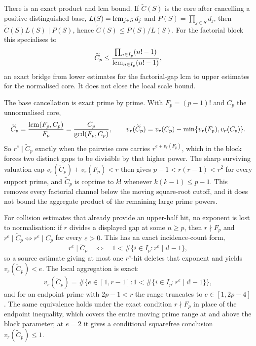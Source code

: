 \documentclass[11pt]{article}
\begin{document}
There is an exact product and lcm bound.  If $\widetilde C(S)$ is the core
after cancelling a positive distinguished base, $L(S)=\operatorname{lcm}_{j\in S}d_j$ and
$P(S)=\prod_{j\in S}d_j$, then $\widetilde C(S)L(S)\mid P(S)$, hence
$\widetilde C(S)\le P(S)/L(S)$.  For the factorial block this specialises to
\[
 \widetilde C_p\le\frac{\prod_{n\in I_p}(n!-1)}{\operatorname{lcm}_{n\in I_p}(n!-1)},
\]
an exact bridge from lower estimates for the factorial-gap lcm to upper
estimates for the normalised core.  It does not close the local scale bound.

The base cancellation is exact prime by prime.  With $F_p=(p-1)!$ and $C_p$
the unnormalised core,
\[
 \widetilde C_p=\frac{\operatorname{lcm}(F_p,C_p)}{F_p}=\frac{C_p}{\gcd(F_p,C_p)},\qquad
 v_r(\widetilde C_p)=v_r(C_p)-\min\{v_r(F_p),v_r(C_p)\} .
\]
So $r^e\mid\widetilde C_p$ exactly when the pairwise core carries
$r^{e+v_r(F_p)}$, which in the block forces two distinct gaps to be divisible
by that higher power.  The sharp surviving valuation cap
$v_r(\widetilde C_p)+v_r(F_p)<r$ then gives $p-1<r(r-1)<r^2$ for every
support prime, and $\widetilde C_p$ is coprime to $k!$ whenever
$k(k-1)\le p-1$.  This removes every factorial channel below the moving
square-root cutoff, and it does not bound the aggregate product of the
remaining large prime powers.

For collision estimates that already provide an upper-half hit, no exponent
is lost to normalisation: if $r$ divides a displayed gap at some $n\ge p$,
then $r\nmid F_p$ and $r^e\mid\widetilde C_p\iff r^e\mid C_p$ for every
$e>0$.  This has an exact incidence-count form,
\[
 r^e\mid\widetilde C_p
 \quad\Longleftrightarrow\quad
 1<\#\{i\in I_p:r^e\mid i!-1\},
\]
so a source estimate giving at most one $r^e$-hit deletes that exponent and
yields $v_r(\widetilde C_p)<e$.  The local aggregation is exact:
\[
 v_r(\widetilde C_p)=\#\bigl\{e\in[1,r-1]:1<\#\{i\in I_p:r^e\mid i!-1\}\bigr\},
\]
and for an endpoint prime with $2p-1<r$ the range truncates to
$e\in[1,2p-4]$.  The same equivalence holds under the exact condition
$r\nmid F_p$ in place of the endpoint inequality, which covers the entire
moving prime range at and above the block parameter; at $e=2$ it gives a
conditional squarefree conclusion $v_r(\widetilde C_p)\le1$.
\end{document}
